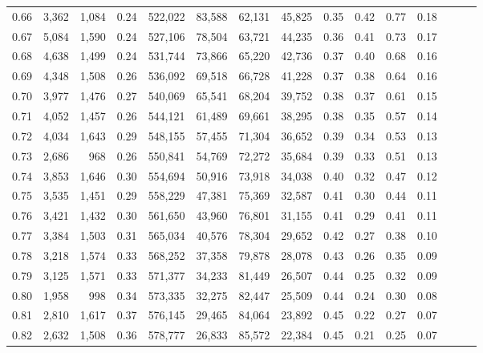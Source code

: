 \begin{tabular}{rrrrrrrrrrrrrrr}
0.66 &   3,362 &  1,084 &  0.24 &  522,022 &   83,588 &   62,131 &   45,825 &  0.35 &  0.42 &  0.77 &      0.18 \\
0.67 &   5,084 &  1,590 &  0.24 &  527,106 &   78,504 &   63,721 &   44,235 &  0.36 &  0.41 &  0.73 &      0.17 \\
0.68 &   4,638 &  1,499 &  0.24 &  531,744 &   73,866 &   65,220 &   42,736 &  0.37 &  0.40 &  0.68 &      0.16 \\
0.69 &   4,348 &  1,508 &  0.26 &  536,092 &   69,518 &   66,728 &   41,228 &  0.37 &  0.38 &  0.64 &      0.16 \\
0.70 &   3,977 &  1,476 &  0.27 &  540,069 &   65,541 &   68,204 &   39,752 &  0.38 &  0.37 &  0.61 &      0.15 \\
0.71 &   4,052 &  1,457 &  0.26 &  544,121 &   61,489 &   69,661 &   38,295 &  0.38 &  0.35 &  0.57 &      0.14 \\
0.72 &   4,034 &  1,643 &  0.29 &  548,155 &   57,455 &   71,304 &   36,652 &  0.39 &  0.34 &  0.53 &      0.13 \\
0.73 &   2,686 &    968 &  0.26 &  550,841 &   54,769 &   72,272 &   35,684 &  0.39 &  0.33 &  0.51 &      0.13 \\
0.74 &   3,853 &  1,646 &  0.30 &  554,694 &   50,916 &   73,918 &   34,038 &  0.40 &  0.32 &  0.47 &      0.12 \\
0.75 &   3,535 &  1,451 &  0.29 &  558,229 &   47,381 &   75,369 &   32,587 &  0.41 &  0.30 &  0.44 &      0.11 \\
0.76 &   3,421 &  1,432 &  0.30 &  561,650 &   43,960 &   76,801 &   31,155 &  0.41 &  0.29 &  0.41 &      0.11 \\
0.77 &   3,384 &  1,503 &  0.31 &  565,034 &   40,576 &   78,304 &   29,652 &  0.42 &  0.27 &  0.38 &      0.10 \\
0.78 &   3,218 &  1,574 &  0.33 &  568,252 &   37,358 &   79,878 &   28,078 &  0.43 &  0.26 &  0.35 &      0.09 \\
0.79 &   3,125 &  1,571 &  0.33 &  571,377 &   34,233 &   81,449 &   26,507 &  0.44 &  0.25 &  0.32 &      0.09 \\
0.80 &   1,958 &    998 &  0.34 &  573,335 &   32,275 &   82,447 &   25,509 &  0.44 &  0.24 &  0.30 &      0.08 \\
0.81 &   2,810 &  1,617 &  0.37 &  576,145 &   29,465 &   84,064 &   23,892 &  0.45 &  0.22 &  0.27 &      0.07 \\
0.82 &   2,632 &  1,508 &  0.36 &  578,777 &   26,833 &   85,572 &   22,384 &  0.45 &  0.21 &  0.25 &      0.07 \\

\end{tabular}
